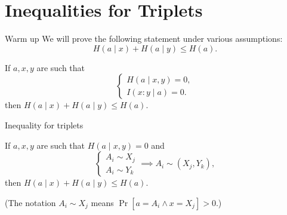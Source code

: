 \documentclass[aspectratio=169]{beamer}
\begin{document}
	\section{Inequalities for Triplets}
    \begin{frame}{Warm up}
		We will prove the following statement under various assumptions:
		\[
		    H(a \mid x) + H(a \mid y) \le H(a).
		\]

		\begin{problem}
		    If \(a, x, y\) are such that
		\[
		    \begin{cases}
		        H(a \mid x, y) = 0,\\
		        I(x : y \mid a) = 0.
		    \end{cases}
		\]
		then \(H(a \mid x) + H(a \mid y) \le H(a)\).
		\end{problem}
    \end{frame}

    \begin{frame}{Inequality for triplets}
    \begin{theorem}
        If \(a, x, y\) are such that \(H(a \mid x, y) = 0\) and
    \[
        \begin{cases}
            A_i \sim X_j\\
            A_i \sim Y_k
        \end{cases} \implies A_i \sim (X_j, Y_k),
    \]
    then \(H(a \mid x) + H(a \mid y) \le H(a)\).
    \end{theorem}

    \medskip (The notation \(A_i \sim X_j\) means \(\Pr[a = A_i \land x = X_j] > 0\).)
    \end{frame}
\end{document}
